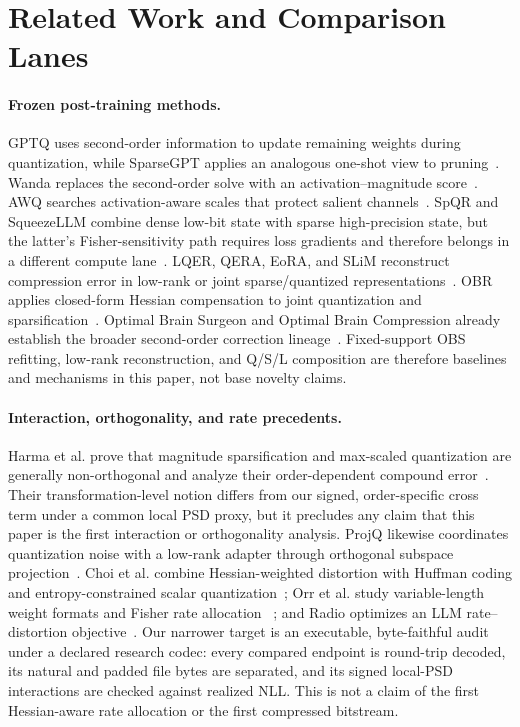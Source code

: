 \section{Related Work and Comparison Lanes}
\label{sec:related}

\paragraph{Frozen post-training methods.}
GPTQ uses second-order information to update remaining weights during
quantization, while SparseGPT applies an analogous one-shot view to
pruning~\citep{frantar2023gptq,frantar2023sparsegpt}.  Wanda replaces the
second-order solve with an activation--magnitude score~\citep{sun2024wanda}.
AWQ searches activation-aware scales that protect salient
channels~\citep{lin2024awq}.  SpQR and SqueezeLLM combine dense low-bit state
with sparse high-precision state, but the latter's Fisher-sensitivity path
requires loss gradients and therefore belongs in a different compute
lane~\citep{dettmers2024spqr,kim2024squeezellm}.  LQER, QERA, EoRA, and SLiM
reconstruct compression error in low-rank or joint sparse/quantized
representations~\citep{zhang2024lqer,zhang2025qera,liu2024eora,mozaffari2025slim}.
OBR applies closed-form Hessian compensation to joint quantization and
sparsification~\citep{guo2026optimal}.  Optimal Brain Surgeon and Optimal
Brain Compression already establish the broader second-order correction
lineage~\citep{hassibi1993obs,frantar2022obc}.  Fixed-support OBS refitting,
low-rank reconstruction, and Q/S/L composition are therefore baselines and
mechanisms in this paper, not base novelty claims.

\paragraph{Interaction, orthogonality, and rate precedents.}
Harma et al. prove that magnitude sparsification and max-scaled quantization
are generally non-orthogonal and analyze their order-dependent compound
error~\citep{harma2025effective}.  Their transformation-level notion differs
from our signed, order-specific cross term under a common local PSD proxy, but
it precludes any claim that this paper is the first interaction or
orthogonality analysis.  ProjQ likewise coordinates quantization noise with a
low-rank adapter through orthogonal subspace projection~\citep{yu2026projq}.
Choi et al. combine Hessian-weighted distortion with Huffman coding and
entropy-constrained scalar quantization~\citep{choi2017towards}; Orr et al.
study variable-length weight formats and Fisher rate allocation
~\citep{orr2025optimal}; and Radio optimizes an LLM rate--distortion
objective~\citep{young2025radio}.  Our narrower target is an executable,
byte-faithful audit under a declared research codec: every compared endpoint
is round-trip decoded, its natural and padded file bytes are separated, and
its signed local-PSD interactions are checked against realized NLL.  This is
not a claim of the first Hessian-aware rate allocation or the first compressed
bitstream.

